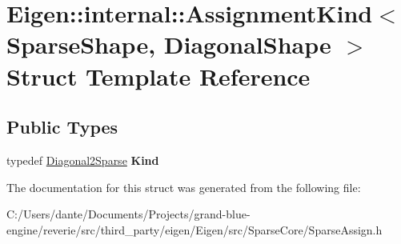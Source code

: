 \hypertarget{struct_eigen_1_1internal_1_1_assignment_kind_3_01_sparse_shape_00_01_diagonal_shape_01_4}{}\section{Eigen\+::internal\+::Assignment\+Kind$<$ Sparse\+Shape, Diagonal\+Shape $>$ Struct Template Reference}
\label{struct_eigen_1_1internal_1_1_assignment_kind_3_01_sparse_shape_00_01_diagonal_shape_01_4}
\subsection*{Public Types}
\begin{DoxyCompactItemize}
\item 
\mbox{\label{struct_eigen_1_1internal_1_1_assignment_kind_3_01_sparse_shape_00_01_diagonal_shape_01_4_a322a83d6eb9dfa1d733349a506002ef5}} 
typedef \mbox{\hyperlink{struct_eigen_1_1internal_1_1_diagonal2_sparse}{Diagonal2\+Sparse}} {\bfseries Kind}
\end{DoxyCompactItemize}


The documentation for this struct was generated from the following file\+:\begin{DoxyCompactItemize}
\item 
C\+:/\+Users/dante/\+Documents/\+Projects/grand-\/blue-\/engine/reverie/src/third\+\_\+party/eigen/\+Eigen/src/\+Sparse\+Core/Sparse\+Assign.\+h\end{DoxyCompactItemize}
